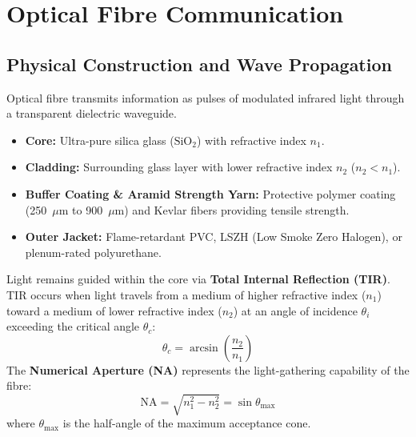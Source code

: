 \section{Optical Fibre Communication}

\subsection{Physical Construction and Wave Propagation}
Optical fibre transmits information as pulses of modulated infrared light through a transparent dielectric waveguide.
\begin{itemize}[leftmargin=*]
    \item \textbf{Core:} Ultra-pure silica glass ($\text{SiO}_2$) with refractive index $n_1$.
    \item \textbf{Cladding:} Surrounding glass layer with lower refractive index $n_2$ ($n_2 < n_1$).
    \item \textbf{Buffer Coating \& Aramid Strength Yarn:} Protective polymer coating (250~$\mu$m to 900~$\mu$m) and Kevlar fibers providing tensile strength.
    \item \textbf{Outer Jacket:} Flame-retardant PVC, LSZH (Low Smoke Zero Halogen), or plenum-rated polyurethane.
\end{itemize}

\begin{keyconcept}
Light remains guided within the core via \textbf{Total Internal Reflection (TIR)}. TIR occurs when light travels from a medium of higher refractive index ($n_1$) toward a medium of lower refractive index ($n_2$) at an angle of incidence $\theta_i$ exceeding the critical angle $\theta_c$:
\[
\theta_c = \arcsin\left(\frac{n_2}{n_1}\right)
\]
The \textbf{Numerical Aperture (NA)} represents the light-gathering capability of the fibre:
\[
\text{NA} = \sqrt{n_1^2 - n_2^2} = \sin \theta_{\text{max}}
\]
where $\theta_{\text{max}}$ is the half-angle of the maximum acceptance cone.
\end{keyconcept}


